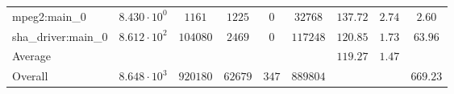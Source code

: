 \begin{tabular}{|l|c|c|c|c|c|c|c|c|}
mpeg2:main\_0           & $ 8.430 \cdot 10^{0} $ & $ 1161   $ & $ 1225  $ & $ 0   $ & $ 32768  $ & $ 137.72      $ & $ 2.74    $ & $ 2.60    $ \\
sha\_driver:main\_0     & $ 8.612 \cdot 10^{2} $ & $ 104080 $ & $ 2469  $ & $ 0   $ & $ 117248 $ & $ 120.85      $ & $ 1.73    $ & $ 63.96   $ \\
\hline
Average                 & $                    $ & $        $ & $       $ & $     $ & $        $ & $ 119.27      $ & $ 1.47    $ & $         $ \\
\hline
Overall                 & $ 8.648 \cdot 10^{3} $ & $ 920180 $ & $ 62679 $ & $ 347 $ & $ 889804 $ & $             $ & $         $ & $ 669.23  $ \\
\hline
\end{tabular}
